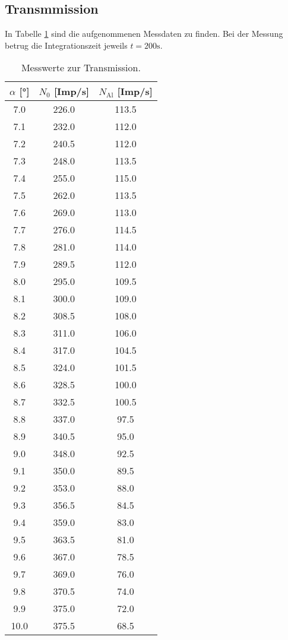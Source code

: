 \subsection{Transmmission}

In Tabelle \ref{tab:trans} sind die aufgenommenen Messdaten zu finden. Bei 
der Messung betrug die Integrationszeit jeweils $t = 200 \si{\s}$.

\begin{table}
    \centering
    \begin{tabular}{c c c}
        \toprule
        $\alpha$ [°] & $N_0$ [Imp/s] & $N_\text{Al}$ [Imp/s] \\
        \midrule
        7.0	&  226.0 & 113.5 \\ 
        7.1	&  232.0 & 112.0 \\
        7.2	&  240.5 & 112.0 \\
        7.3	&  248.0 & 113.5 \\
        7.4	&  255.0 & 115.0 \\
        7.5	&  262.0 & 113.5 \\
        7.6	&  269.0 & 113.0 \\
        7.7	&  276.0 & 114.5 \\
        7.8	&  281.0 & 114.0 \\
        7.9	&  289.5 & 112.0 \\
        8.0	&  295.0 & 109.5 \\
        8.1	&  300.0 & 109.0 \\
        8.2	&  308.5 & 108.0 \\
        8.3	&  311.0 & 106.0 \\
        8.4	&  317.0 & 104.5 \\
        8.5	&  324.0 & 101.5 \\
        8.6	&  328.5 & 100.0 \\
        8.7	&  332.5 & 100.5  \\
        8.8	&  337.0 & 97.5  \\
        8.9	&  340.5 & 95.0  \\
        9.0	&  348.0 & 92.5  \\
        9.1	&  350.0 & 89.5  \\
        9.2	&  353.0 & 88.0  \\
        9.3	&  356.5 & 84.5 \\
        9.4	&  359.0 & 83.0 \\
        9.5	&  363.5 & 81.0 \\
        9.6	&  367.0 & 78.5 \\
        9.7	&  369.0 & 76.0 \\
        9.8	&  370.5 & 74.0 \\
        9.9	&  375.0 & 72.0 \\
        10.0&  375.5 & 68.5 \\
        \bottomrule
    \end{tabular}
    \caption{Messwerte zur Transmission.}
    \label{tab:trans}
\end{table}

